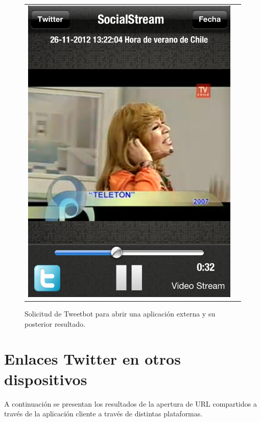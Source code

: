 \begin{figure}[H]
\begin{tabular}{cc}
	\includegraphics[scale=0.28]{imgs/tweetbot-appopened.png} \\
	\end{tabular}
	\caption{Solicitud de Tweetbot para abrir una aplicación externa y su posterior resultado.}
	\label{fig:tweetbot-sstream}
\end{figure}

\section{Enlaces Twitter en otros dispositivos}
A continuación se presentan los resultados de la apertura de URL compartidos a través de la aplicación cliente a través de distintas plataformas.
	
